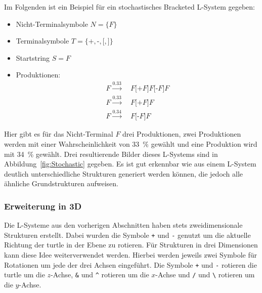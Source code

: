 Im Folgenden ist ein Beispiel für ein stochastisches Bracketed L-System gegeben:
\begin{itemize}
    \item Nicht-Terminalsymbole $N=\{F\}$
    \item Terminalsymbole $T=\{\texttt{+},\texttt{-},\texttt{[},\texttt{]}\}$
    \item Startstring $S=F$
    \item Produktionen:
    \begin{align*}
        F\xrightarrow{0.33} & ~F\texttt{[+}F\texttt{]}F\texttt{[-}F\texttt{]} F \\
        F\xrightarrow{0.33} & ~F\texttt{[+}F\texttt{]} F                         \\
        F\xrightarrow{0.34} & ~F\texttt{[-}F\texttt{]} F
    \end{align*}
\end{itemize}

Hier gibt es für das Nicht-Terminal $F$ drei Produktionen, zwei Produktionen werden mit einer Wahrscheinlichkeit von \SI{33}{\percent} gewählt und eine Produktion wird mit \SI{34}{\percent} gewählt.
Drei resultierende Bilder dieses L-Systems sind in Abbildung~\ref{fig:Stochastic} gegeben.
Es ist gut erkennbar wie aus einem L-System deutlich unterschiedliche Strukturen generiert werden können, die jedoch alle ähnliche Grundstrukturen aufweisen.
%        
%        
%        


\subsubsection{Erweiterung in 3D}\label{subsub: L-System 3D}
Die L-Systeme aus den vorherigen Abschnitten haben stets zweidimensionale Strukturen erstellt.
Dabei wurden die Symbole \texttt{+} und \texttt{-} genutzt um die aktuelle Richtung der turtle in der Ebene zu rotieren.
Für Strukturen in drei Dimensionen kann diese Idee weiterverwendet werden.
Hierbei werden jeweils zwei Symbole für Rotationen um jede der drei Achsen eingeführt.
Die Symbole \texttt{+} und \texttt{-} rotieren die turtle um die $z$-Achse, \texttt{\&} und \texttt{\textasciicircum} rotieren um die $x$-Achse und \texttt{/} und \texttt{\textbackslash} rotieren um die $y$-Achse.

